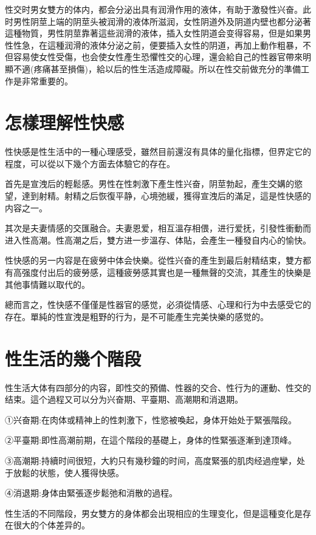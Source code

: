 \documentclass[12pt,UTF8]{ctexbook}
\begin{document}
性交时男女雙方的体内，都会分泌出具有润滑作用的液体，有助于激發性兴奋。此时男性阴莖上端的阴莖头被润滑的液体所滋润，女性阴道外及阴道内壁也都分泌著這種物質，男性阴莖靠著這些润滑的液体，插入女性阴道会变得容易，但是如果男性性急，在這種润滑的液体分泌之前，便要插入女性的阴道，再加上動作粗暴，不但容易使女性受傷，也会使女性產生恐懼性交的心理，還会給自己的性器官帶來明顯不適(疼痛甚至損傷)，給以后的性生活造成障礙。所以在性交前做充分的準備工作是非常重要的。

\section{怎樣理解性快感}

性快感是性生活中的一種心理感受，雖然目前還沒有具体的量化指標，但界定它的程度，可以從以下幾个方面去体驗它的存在。

首先是宣洩后的輕鬆感。男性在性刺激下產生性兴奋，阴莖勃起，產生交媾的慾望，達到射精。射精之后恢復平静，心境弛緩，獲得宣洩后的滿足，這是性快感的内容之一。

其次是夫妻情感的交匯融合。夫妻恩爱，相互溫存相偎，进行爱抚，引發性衝動而进入性高潮。性高潮之后，雙方进一步溫存、体貼，会產生一種發自内心的愉快。

性快感的另一内容是在疲勞中体会快樂。從性兴奋的產生到最后射精结束，雙方都有高强度付出后的疲勞感，這種疲勞感其實也是一種無聲的交流，其產生的快樂是其他事情難以取代的。

總而言之，性快感不僅僅是性器官的感觉，必須從情感、心理和行为中去感受它的存在。單純的性宣洩是粗野的行为，是不可能產生完美快樂的感觉的。

\section{性生活的幾个階段}

性生活大体有四部分的内容，即性交的預備、性器的交合、性行为的運動、性交的结束。這个過程又可以分为兴奋期、平臺期、高潮期和消退期。

①兴奋期:在肉体或精神上的性刺激下，性慾被喚起，身体开始处于緊張階段。

②平臺期:即性高潮前期，在這个階段的基礎上，身体的性緊張逐漸到達顶峰。

③高潮期:持續时间很短，大約只有幾秒鐘的时间，高度緊張的肌肉经過痙攣，处于放鬆的状態，使人獲得快感。

④消退期:身体由緊張逐步鬆弛和消散的過程。

性生活的不同階段，男女雙方的身体都会出現相应的生理变化，但是這種变化是存在很大的个体差异的。
\end{document}
